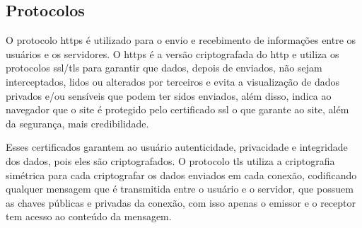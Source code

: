 \subsection {Protocolos}
O protocolo \ac{https} é utilizado para o envio e recebimento de informações entre os usuários e os servidores. O \ac{https} é a versão criptografada do \ac{http} e utiliza os protocolos \ac{ssl}/\ac{tls} para garantir que dados, depois de enviados, não sejam interceptados, lidos ou alterados por terceiros e evita a visualização de dados privados e/ou sensíveis que podem ter sidos enviados, além disso, indica ao navegador que o site é protegido pelo certificado \ac{ssl} o que garante ao site, além da segurança, mais credibilidade. 

Esses certificados garantem ao usuário autenticidade, privacidade e integridade dos dados, pois eles são criptografados. O protocolo \ac{tls} utiliza a criptografia simétrica para cada criptografar os dados enviados em cada conexão, codificando qualquer mensagem que é transmitida entre o usuário e o servidor, que possuem as chaves públicas e privadas da conexão, com isso apenas o emissor e o receptor tem acesso ao conteúdo da mensagem.
